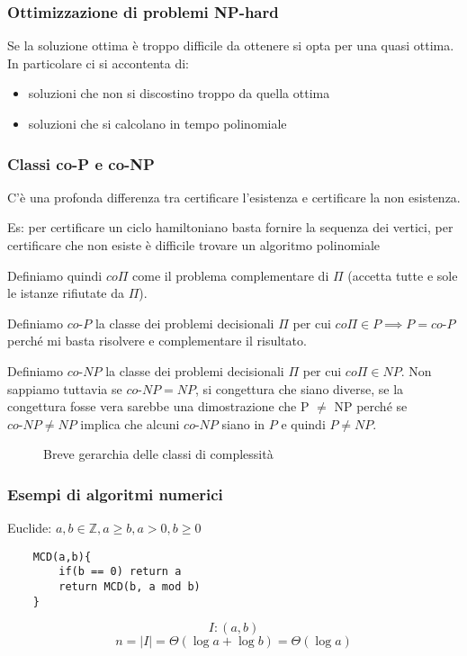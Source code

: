 \subsubsection{Ottimizzazione di problemi NP-hard}
Se la soluzione ottima è troppo difficile da ottenere si opta per una quasi ottima. In particolare ci si accontenta di:
\begin{itemize}
    \item soluzioni che non si discostino troppo da quella ottima
    \item soluzioni che si calcolano in tempo polinomiale
\end{itemize}

\subsubsection{Classi co-P e co-NP}
C'è una profonda differenza tra certificare l'esistenza e certificare la non esistenza.

Es: per certificare un ciclo hamiltoniano basta fornire la sequenza dei vertici, per certificare che non esiste è difficile trovare un algoritmo polinomiale

Definiamo quindi $co\Pi$ come il problema complementare di $\Pi$ (accetta tutte e sole le istanze rifiutate da $\Pi$).

Definiamo $co\text{-}P$ la classe dei problemi decisionali $\Pi$ per cui $co\Pi \in P \implies P=co\text{-}P$ perché mi basta risolvere e complementare il risultato.

Definiamo $co\text{-}NP$ la classe dei problemi decisionali $\Pi$ per cui $co\Pi \in NP$. Non sappiamo tuttavia se $co\text{-}NP = NP$, si congettura che siano diverse, se la congettura fosse vera sarebbe una dimostrazione che P $\neq$ NP perché se $co\text{-}NP \neq NP$ implica che alcuni $co\text{-}NP$ siano in $P$ e quindi $P \neq NP$.

\begin{figure}[H]
  \centering
  
  \caption{Breve gerarchia delle classi di complessità}
\end{figure}

\subsubsection{Esempi di algoritmi numerici}
Euclide: $a, b \in \mathbb{Z}, a \geq b, a > 0, b \geq 0 $
\begin{verbatim}
    MCD(a,b){
        if(b == 0) return a
        return MCD(b, a mod b)
    }
\end{verbatim}
$$ I: \left( a, b \right)  $$
$$ n = |I| = \Theta\left( \log a + \log b \right) = \Theta\left( \log a \right)$$

